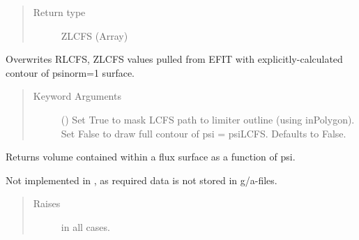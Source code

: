 \documentclass[letterpaper,10pt,english]{sphinxmanual}
\begin{document}
\begin{fulllineitems}
\begin{fulllineitems}
\begin{quote}
\begin{description}
\item[{Return type}] \leavevmode
ZLCFS (Array)

\end{description}\end{quote}

\end{fulllineitems}


\begin{fulllineitems}
\label{\detokenize{eqtools:eqtools.eqdskreader.EqdskReader.remapLCFS}}
Overwrites RLCFS, ZLCFS values pulled from EFIT with
explicitly-calculated contour of psinorm=1 surface.
\begin{quote}\begin{description}
\item[{Keyword Arguments}] \leavevmode
{} () \textendash{} Set True to mask LCFS path to limiter outline
(using inPolygon).  Set False to draw full contour of
psi = psiLCFS.  Defaults to False.

\end{description}\end{quote}

\end{fulllineitems}


\begin{fulllineitems}
\label{\detokenize{eqtools:eqtools.eqdskreader.EqdskReader.getFluxVol}}
Returns volume contained within a flux surface as a function of psi.

Not implemented in {\hyperref[\detokenize{eqtools:eqtools.eqdskreader.EqdskReader}]{}}, as required data is not
stored in g/a-files.
\begin{quote}\begin{description}
\item[{Raises}] \leavevmode
{} \textendash{} in all cases.


\end{description}
\end{quote}
\end{fulllineitems}
\end{fulllineitems}
\end{document}
